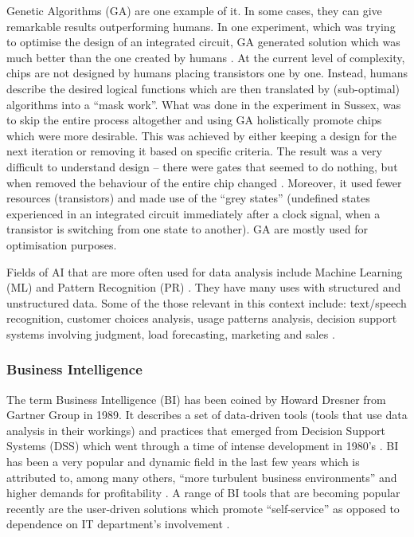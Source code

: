 Genetic Algorithms (GA) are one example of it. In some cases, they can give remarkable results outperforming humans. In one experiment, which was trying to optimise the design of an integrated circuit, GA generated solution which was much better than the one created by humans \citep{Harvey1997}. At the current level of complexity, chips are not designed by humans placing transistors one by one. Instead, humans describe the desired logical functions which are then translated by (sub-optimal) algorithms into a “mask work”. What was done in the experiment in Sussex, was to skip the entire process altogether and using GA holistically promote chips which were more desirable. This was achieved by either keeping a design for the next iteration or removing it based on specific criteria. The result was a very difficult to understand design – there were gates that seemed to do nothing, but when removed the behaviour of the entire chip changed \citep{Harvey1997}. Moreover, it used fewer resources (transistors) and made use of the “grey states” (undefined states experienced in an integrated circuit immediately after a clock signal, when a transistor is switching from one state to another). GA are mostly used for optimisation purposes.

Fields of AI that are more often used for data analysis include Machine Learning (ML) and Pattern Recognition (PR) \citep{bishop2006pattern}. They have many uses with structured and unstructured data. Some of the those relevant in this context include: text/speech recognition, customer choices analysis, usage patterns analysis, decision support systems involving judgment, load forecasting, marketing and sales \citep{witten2005data}.
			
			\subsubsection{Business Intelligence}
			
The term Business Intelligence (BI) has been coined by Howard Dresner from Gartner Group in 1989. It describes a set of data-driven tools (tools that use data analysis in their workings) and practices that emerged from Decision Support Systems (DSS) which went through a time of intense development in 1980’s \citep{power2008decision}. BI has been a very popular and dynamic field in the last few years which is attributed to, among many others, “more turbulent business environments” and higher demands for profitability \citep{sacu2010bidm, power2008decision, baars2008management}. A range of BI tools that are becoming popular recently are the user-driven solutions which promote “self-service” as opposed to dependence on IT department’s involvement \citep{IBM2015a, Qlik2015, Microsoft2015, imhoff2011self}.

